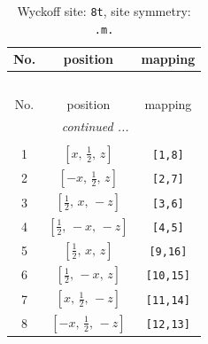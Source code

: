 \documentclass[fleqn,8pt]{jsarticle}
\begin{document}
\renewcommand{\arraystretch}{1.2}
\begin{longtable}{ccc}
\caption{Wyckoff site: {\tt 8t}, site symmetry: {\tt .m.}}
 \\
 \hline \hline
No. & position & mapping \\ \hline \endfirsthead

\multicolumn{2}{l}{\tablename\ \thetable{}} \\
 \hline \hline
No. & position & mapping \\ \hline \endhead

 \hline \hline
\multicolumn{2}{r}{\footnotesize\it continued ...} \\ \endfoot

 \hline \hline
\multicolumn{2}{r}{} \\ \endlastfoot

1 & $\left[ x,\, \frac{1}{2},\, z \right]$ & {\tt [1,8]} \\ \hline
2 & $\left[ - x,\, \frac{1}{2},\, z \right]$ & {\tt [2,7]} \\ \hline
3 & $\left[ \frac{1}{2},\, x,\, - z \right]$ & {\tt [3,6]} \\ \hline
4 & $\left[ \frac{1}{2},\, - x,\, - z \right]$ & {\tt [4,5]} \\ \hline
5 & $\left[ \frac{1}{2},\, x,\, z \right]$ & {\tt [9,16]} \\ \hline
6 & $\left[ \frac{1}{2},\, - x,\, z \right]$ & {\tt [10,15]} \\ \hline
7 & $\left[ x,\, \frac{1}{2},\, - z \right]$ & {\tt [11,14]} \\ \hline
8 & $\left[ - x,\, \frac{1}{2},\, - z \right]$ & {\tt [12,13]} \\
\end{longtable}
\renewcommand{\arraystretch}{1.2}
\end{document}
